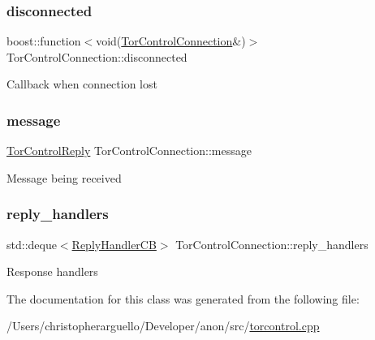 \subsubsection{\texorpdfstring{disconnected}{disconnected}}
{\footnotesize\ttfamily boost\+::function$<$void(\mbox{\hyperlink{class_tor_control_connection}{Tor\+Control\+Connection}}\&)$>$ Tor\+Control\+Connection\+::disconnected\hspace{0.3cm}{\ttfamily [private]}}

Callback when connection lost \mbox{\label{class_tor_control_connection_a0c9dff9582b57ce132a1629a85e52061}} 
\subsubsection{\texorpdfstring{message}{message}}
{\footnotesize\ttfamily \mbox{\hyperlink{class_tor_control_reply}{Tor\+Control\+Reply}} Tor\+Control\+Connection\+::message\hspace{0.3cm}{\ttfamily [private]}}

Message being received \mbox{\label{class_tor_control_connection_a1675ac8361ca030eecd48f32120bddd7}} 
\subsubsection{\texorpdfstring{reply\+\_\+handlers}{reply\_handlers}}
{\footnotesize\ttfamily std\+::deque$<$\mbox{\hyperlink{class_tor_control_connection_a67d9147b8c27456cc7fe15e4d6d8e844}{Reply\+Handler\+CB}}$>$ Tor\+Control\+Connection\+::reply\+\_\+handlers\hspace{0.3cm}{\ttfamily [private]}}

Response handlers 

The documentation for this class was generated from the following file\+:\begin{DoxyCompactItemize}
\item 
/\+Users/christopherarguello/\+Developer/anon/src/\mbox{\hyperlink{torcontrol_8cpp}{torcontrol.\+cpp}}\end{DoxyCompactItemize}
